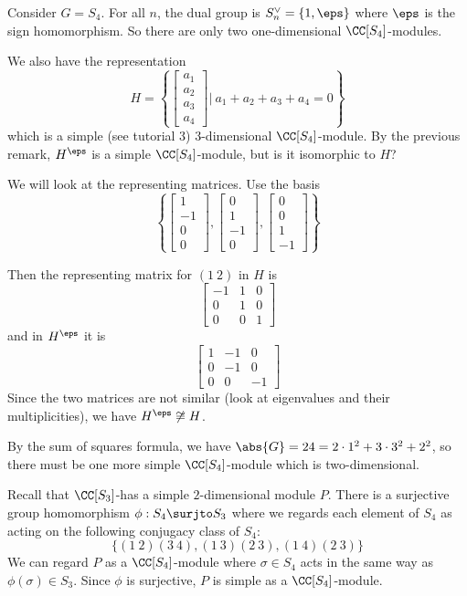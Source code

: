 \begin{exam}
	Consider $G=S_4$.
	For all $n$, the dual group is $S_n^\vee = \{1,\eps\}$ where $\eps$ is the sign homomorphism.
	So there are only two one-dimensional $\CC[S_4]$-modules.
	
	We also have the representation
	\[H=\left\{
	\begin{bmatrix}
		a_1 \\ a_2 \\ a_3 \\a_4
	\end{bmatrix}
	\Bigg \vert \
	a_1+a_2+a_3+a_4=0
	\right\}\]
	which is a simple (see tutorial 3) $3$-dimensional $\CC[S_4]$-module.
	By the previous remark, $H^\eps$ is a simple $\CC[S_4]$-module, but is it isomorphic to $H$?
	
	We will look at the representing matrices.
	Use the basis
	\[\left\{
	\begin{bmatrix}
		1 \\ -1 \\ 0 \\0
	\end{bmatrix},
	\begin{bmatrix}
	0 \\1 \\ -1 \\ 0
	\end{bmatrix},
	\begin{bmatrix}
	0 \\ 0 \\ 1 \\ -1
	\end{bmatrix}
	\right\}\]
	
	Then the representing matrix for $(1\ 2)$ in $H$ is
	\[\begin{bmatrix}
		-1 & 1 & 0 \\
		0 & 1 & 0 \\
		0 & 0 & 1
	\end{bmatrix}\]
	and in $H^\eps$ it is	
	\[\begin{bmatrix}
		1 & -1 & 0 \\
		0 & -1 & 0 \\
		0 & 0 & -1
	\end{bmatrix}\]
	Since the two matrices are not similar (look at eigenvalues and their multiplicities), we have $H^\eps \not\cong H$.
	
	By the sum of squares formula, we have $\abs{G}=24=2 \cdot 1^2 + 3 \cdot 3^2 + 2^2$, so there must be one more simple $\CC[S_4]$-module which is two-dimensional.
	
	Recall that $\CC[S_3]$-has a simple $2$-dimensional module $P$.
	There is a surjective group homomorphism $\phi: S_4 \surjto S_3$ where we regards each element of $S_4$ as acting on the following conjugacy class of $S_4$:
	\[\{(1\ 2)(3\ 4), (1\ 3)(2\ 3), (1\ 4)(2\ 3)\}\]
	We can regard $P$ as a $\CC[S_4]$-module where $\sigma \in S_4$ acts in the same way as $\phi(\sigma) \in S_3$.
	Since $\phi$ is surjective, $P$ is simple as a $\CC[S_4]$-module.
\end{exam}
